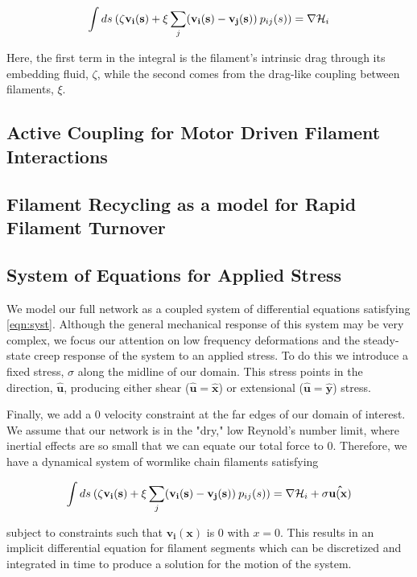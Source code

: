 \documentclass[10pt,letterpaper]{article}
\begin{document}
\begin{equation}
\label{eqn:syst}
\int ds \: (\mathbf{\zeta v_i(s)} + \xi \sum _j(\mathbf{v_i(s)}-\mathbf{v_j(s)}) \: p_{ij}(s))= \nabla {\cal H}_i
\end{equation}

Here, the first term in the integral is the filament's intrinsic drag through its embedding fluid, $\zeta$, while the second comes from the drag-like coupling between filaments, $\xi$.  

\subsection*{Active Coupling for Motor Driven Filament Interactions}

\subsection*{Filament Recycling as a model for Rapid Filament Turnover}

\subsection*{System of Equations for Applied Stress}
We model our full network as a coupled system of differential equations satisfying \ref{eqn:syst}.  Although the general mechanical response of this system may be very complex, we focus our attention on low frequency deformations and the steady-state creep response of the system to an applied stress.  To do this we introduce a fixed stress, $\sigma$ along the midline of our domain.  This stress points in the direction, $\mathbf{\hat{u}}$, producing either shear ($\mathbf{\hat{u}}=\mathbf{\hat{x}}$) or extensional ($\mathbf{\hat{u}}=\mathbf{\hat{y}}$) stress.

Finally, we add a 0 velocity constraint at the far edges of our domain of interest.  We assume that our network is in the "dry," low Reynold's number limit, where inertial effects are so small that we can equate our total force to 0.  Therefore, we have a dynamical system of wormlike chain filaments satisfying 

\begin{equation}
\int ds \: (\zeta\mathbf{v_i(s)} + \xi \sum _j(\mathbf{v_i(s)}-\mathbf{v_j(s)}) \: p_{ij}(s)) = \nabla {\cal H}_i + \sigma\mathbf{\hat{u(x)}}
\end{equation}

subject to constraints such that $\mathbf{v_i(x)}$ is 0 with $x=0$.  This results in an implicit differential equation for filament segments which can be discretized and integrated in time to produce a solution for the motion of the system.
\end{document}

